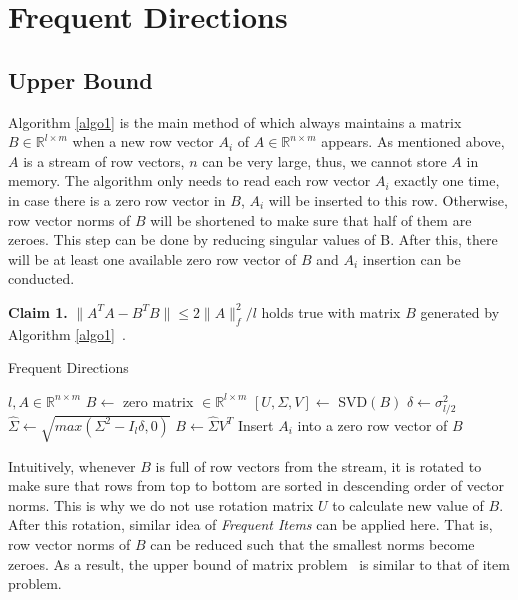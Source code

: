 \documentclass{acm_proc_article-sp}
\begin{document}
\section{Frequent Directions}

\subsection{Upper Bound}

Algorithm \ref{algo1} is the main method of \cite{ref1} which always maintains a matrix $B \in \mathbb{R}^{l \times m}$ when a new row vector $A_{i}$ of $A \in \mathbb{R}^{n \times m}$ appears. As mentioned above, $A$ is a stream of row vectors, $n$ can be very large, thus, we cannot store $A$ in memory. The algorithm only needs to read each row vector $A_{i}$ exactly one time, in case there is a zero row vector in $B$, $A_{i}$ will be inserted to this row. Otherwise, row vector norms of $B$ will be shortened to make sure that half of them are zeroes. This step can be done by reducing singular values of B. After this, there will be at least one available zero row vector of $B$ and $A_{i}$ insertion can be conducted.

\textbf{Claim 1.} $\|A^TA - B^TB\| \leq 2\|A\|^2_{f} / l$ holds true with matrix $B$ generated by Algorithm \ref{algo1}~\cite{ref1}.

\begin{algorithm}
\caption{Frequent Directions~\cite{ref1}}
\label{algo1}
\begin{algorithmic}
\REQUIRE $l, A \in \mathbb{R}^{n \times m}$
\STATE $B \leftarrow$ zero matrix $\in \mathbb{R}^{l \times m}$
\STATE $[U, \Sigma, V] \leftarrow$ SVD$(B)$
\STATE $\delta \leftarrow \sigma^2_{l/2}$
\STATE $\hat{\Sigma} \leftarrow \sqrt{max(\Sigma^2 - I_{l} \delta, 0)}$
\STATE $B \leftarrow \hat{\Sigma} V^T$
\ENDIF
\STATE Insert $A_{i}$ into a zero row vector of $B$
\ENDFOR
\end{algorithmic}
\end{algorithm}

Intuitively, whenever $B$ is full of row vectors from the stream, it is rotated to make sure that rows from top to bottom are sorted in descending order of vector norms. This is why we do not use rotation matrix $U$ to calculate new value of $B$. After this rotation, similar idea of \textit{Frequent Items} can be applied here. That is, row vector norms of $B$ can be reduced such that the smallest norms become zeroes. As a result, the upper bound of matrix problem~\cite{ref1} is similar to that of item problem.
\end{document}
